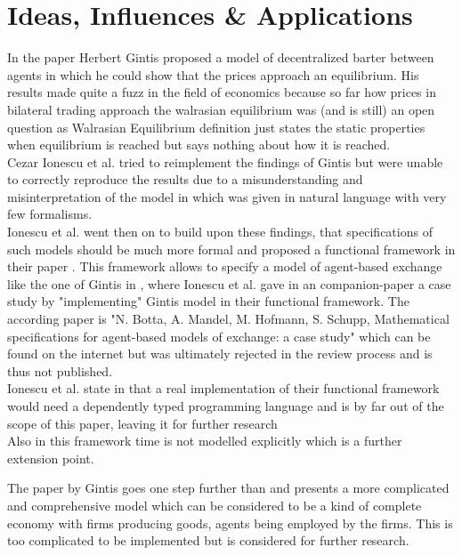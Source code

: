 \documentclass{article}
\begin{document}

\section{Ideas, Influences \& Applications}
In the paper \cite{Gintis2006} Herbert Gintis proposed a model of decentralized barter between agents in which he could show that the prices approach an equilibrium. His results made quite a fuzz in the field of economics because so far how prices in bilateral trading approach the walrasian equilibrium was (and is still) an open question as Walrasian Equilibrium definition just states the static properties when equilibrium is reached but says nothing about how it is reached. \\
Cezar Ionescu et al. tried to reimplement the findings of Gintis but were unable to correctly reproduce the results due to a misunderstanding and misinterpretation of the model in \cite{Gintis2006} which was given in natural language with very few formalisms. \\
Ionescu et al. went then on to build upon these findings, that specifications of such models should be much more formal and proposed a functional framework in their paper \cite{Botta20114025}. This framework allows to specify a model of agent-based exchange like the one of Gintis in \cite{Gintis2006}, where Ionescu et al. gave in an companion-paper a case study by "implementing" Gintis model in their functional framework. The according paper is "N. Botta, A. Mandel, M. Hofmann, S. Schupp, Mathematical specifications for agent-based models of exchange: a case study" which can be found on the internet but was ultimately rejected in the review process and is thus not published. \\
Ionescu et al. state in \cite{Botta20114025} that a real implementation of their functional framework would need a dependently typed programming language and is by far out of the scope of this paper, leaving it for further research \\
Also in this framework time is not modelled explicitly which is a further extension point.

\bigskip

The paper \cite{gintis_dynamics_2007} by Gintis goes one step further than \cite{Gintis2006} and presents a more complicated and comprehensive model which can be considered to be a kind of complete economy with firms producing goods, agents being employed by the firms. This is too complicated to be implemented but is considered for further research.
\end{document}
